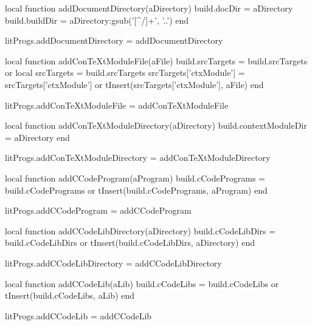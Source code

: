 local function addDocumentDirectory(aDirectory)
  build.docDir   = aDirectory
  build.buildDir = aDirectory:gsub('[^/]+', '..')
end

litProgs.addDocumentDirectory = addDocumentDirectory

local function addConTeXtModuleFile(aFile)
  build.srcTargets = build.srcTargets or { }
  local srcTargets = build.srcTargets
  srcTargets['ctxModule'] = srcTargets['ctxModule'] or { }
  tInsert(srcTargets['ctxModule'], aFile)
end

litProgs.addConTeXtModuleFile = addConTeXtModuleFile

local function addConTeXtModuleDirectory(aDirectory)
  build.contextModuleDir = aDirectory
end

litProgs.addConTeXtModuleDirectory = addConTeXtModuleDirectory

local function addCCodeProgram(aProgram)
  build.cCodePrograms = build.cCodePrograms or { }
  tInsert(build.cCodePrograms, aProgram)
end

litProgs.addCCodeProgram = addCCodeProgram

local function addCCodeLibDirectory(aDirectory)
  build.cCodeLibDirs = build.cCodeLibDirs or { }
  tInsert(build.cCodeLibDirs, aDirectory)
end

litProgs.addCCodeLibDirectory = addCCodeLibDirectory

local function addCCodeLib(aLib)
  build.cCodeLibs = build.cCodeLibs or { }
  tInsert(build.cCodeLibs, aLib)
end

litProgs.addCCodeLib = addCCodeLib

